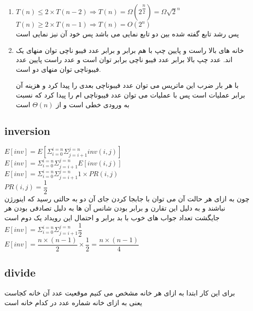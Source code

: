 \documentclass[a4paper]{article}
\begin{document}
\begin{enumerate}
\item{}
$T(n) \leq 2 \times T(n-2) \Rightarrow T(n) = \Omega(2^{\dfrac{n}{2}}) = \Omega\sqrt{2}^n$\\
$T(n) \geq 2 \times T(n-1) \Rightarrow T(n) = O(2^n)$
\\
پس رشد تابع گفته شده بین دو تابع نمایی می باشد پس خود آن نیز نمایی است

\item{}
خانه های بالا راست و پایین چپ با هم برابر و برابر عدد فیبو ناچی توان منهای یک اند. عدد چپ بالا برابر عدد فیبو ناچی برابر توان است و عدد راست پایین عدد فیبوناچی توان منهای دو است.

با هر بار ضرب این ماتریس می توان عدد فیبوناچی بعدی را پیدا کرد و هزینه آن برابر عملیات است
پس با
عملیات می توان عدد فیبوناچی  ام را پیدا کرد که نسبت به ورودی خطی است و از
$\Theta(n)$
است

\end{enumerate}
\newpage
\begin{latin}
\section*{inversion}
\end{latin}
$ E[inv] = E[\Sigma_{i = 0}^{i = n}{\Sigma_{j = i + 1}^{j = n}inv(i,j)}]$
\\
$ E[inv] = \Sigma_{i = 0}^{i = n}{\Sigma_{j = i + 1}^{j = n}E[inv(i,j)]}$
\\
$ E[inv] = \Sigma_{i = 0}^{i = n}{\Sigma_{j = i + 1}^{j = n}1\times PR(i,j)}$\\
$PR(i,j) = \dfrac{1}{2}$\\
چون به ازای هر حالت آن می توان با جابجا کردن جای آن دو به حالتی رسید که اینورژن نباشند و به دلیل این تقارن و برابر بودن شانس آن ها به دلیل تصادفی بودن هر جایگشت تعداد جواب های خوب با بد برابر و احتمال این رویداد یک دوم است\\

$ E[inv] = \Sigma_{i = 0}^{i = n}{\Sigma_{j = i + 1}^{j = n}\dfrac{1}{2}}$\\
$ E[inv] = \dfrac{n\times (n-1)}{2} \times \dfrac{1}{2} = \dfrac{n\times (n-1)}{4}$ 

\newpage
\begin{latin}
\section*{divide}	
\end{latin}
برای این کار ابتدا به ازای هر خانه مشخص می کنیم موقعیت عدد  آن خانه   کجاست یعنی به ازای خانه شماره
عدد
در کدام خانه است
\end{document}
